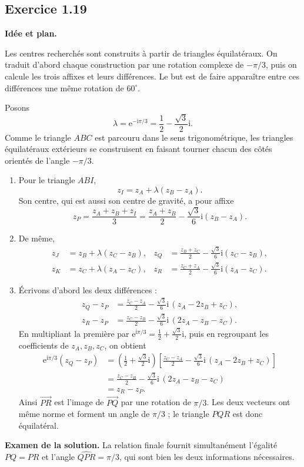 \documentclass[11pt,a4paper]{article}
\newcommand{\e}{\mathrm e}
\newcommand{\ii}{\mathrm i}
\newcommand{\1}{\mathbf 1}
\newenvironment{corrige}[1]{%
  \Needspace{5\baselineskip}%
  \subsection*{Exercice #1}%
  \addcontentsline{toc}{subsection}{Exercice #1}%
}{\medskip}
\newenvironment{methode}{%
  \begin{center}\begin{minipage}{0.94\linewidth}
  \color{MATblue}\textbf{Idée et plan.}\enspace
}{%
  \end{minipage}\end{center}
}
\begin{document}
\begin{corrige}{1.19}
\begin{methode}
Les centres recherchés sont construits à partir de triangles équilatéraux. On traduit d'abord chaque construction par une rotation complexe de $-\pi/3$, puis on calcule les trois affixes et leurs différences. Le but est de faire apparaître entre ces différences une même rotation de $60^\circ$.
\end{methode}
Posons
\[
\lambda=\e^{-\ii\pi/3}=\frac12-\frac{\sqrt3}{2}\ii.
\]
Comme le triangle $ABC$ est parcouru dans le sens trigonométrique, les triangles équilatéraux extérieurs se construisent en faisant tourner chacun des côtés orientés de l'angle $-\pi/3$.
\begin{enumerate}
  \item Pour le triangle $ABI$,
  \[
  \boxed{z_I=z_A+\lambda(z_B-z_A)}.
  \]
  Son centre, qui est aussi son centre de gravité, a pour affixe
  \[
  \boxed{z_P=\frac{z_A+z_B+z_I}{3}
  =\frac{z_A+z_B}{2}-\frac{\sqrt3}{6}\ii(z_B-z_A)}.
  \]

  \item De même,
  \begin{align*}
  z_J&=z_B+\lambda(z_C-z_B),
  &z_Q&=\frac{z_B+z_C}{2}-\frac{\sqrt3}{6}\ii(z_C-z_B),\\
  z_K&=z_C+\lambda(z_A-z_C),
  &z_R&=\frac{z_C+z_A}{2}-\frac{\sqrt3}{6}\ii(z_A-z_C).
  \end{align*}

  \item Écrivons d'abord les deux différences :
  \begin{align*}
  z_Q-z_P
  &=\frac{z_C-z_A}{2}
    -\frac{\sqrt3}{6}\ii\,(z_A-2z_B+z_C),\\
  z_R-z_P
  &=\frac{z_C-z_B}{2}
    -\frac{\sqrt3}{6}\ii\,(2z_A-z_B-z_C).
  \end{align*}
  En multipliant la première par $\e^{\ii\pi/3}
  =\frac12+\frac{\sqrt3}{2}\ii$, puis en regroupant les coefficients
  de $z_A,z_B,z_C$, on obtient
  \begin{align*}
  \e^{\ii\pi/3}(z_Q-z_P)
  &=\left(\frac12+\frac{\sqrt3}{2}\ii\right)
    \left[
      \frac{z_C-z_A}{2}
      -\frac{\sqrt3}{6}\ii\,(z_A-2z_B+z_C)
    \right]\\
  &=\frac{z_C-z_B}{2}
    -\frac{\sqrt3}{6}\ii\,(2z_A-z_B-z_C)\\
  &=z_R-z_P.
  \end{align*}
  Ainsi $\overrightarrow{PR}$ est l'image de $\overrightarrow{PQ}$ par une rotation de $\pi/3$. Les deux vecteurs ont même norme et forment un angle de $\pi/3$ ; le triangle $PQR$ est donc équilatéral.
\end{enumerate}
\textbf{Examen de la solution.} La relation finale fournit simultanément l'égalité $PQ=PR$ et l'angle $\widehat{QPR}=\pi/3$, qui sont bien les deux informations nécessaires.
\end{corrige}
\end{document}
